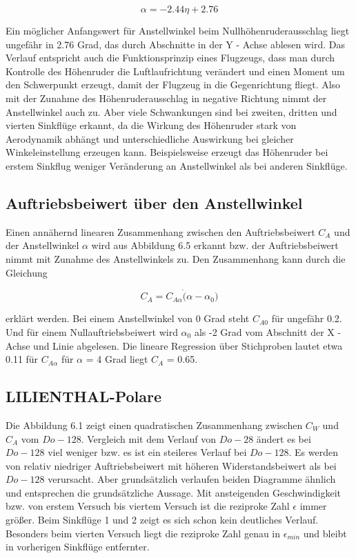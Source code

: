 \begin{equation*}
\alpha = -2.44 \eta + 2.76
\end{equation*}

Ein möglicher Anfangswert für Anstellwinkel beim Nullhöhenruderausschlag liegt ungefähr in 2.76 Grad, das durch Abschnitte in der Y - Achse ablesen wird. Das Verlauf entspricht auch die Funktionsprinzip eines Flugzeugs, dass man durch Kontrolle des Höhenruder die Luftlaufrichtung verändert und einen Moment um den Schwerpunkt erzeugt, damit der Flugzeug in die Gegenrichtung fliegt. Also mit der Zunahme des Höhenruderausschlag in negative Richtung nimmt der Anstellwinkel auch zu. Aber viele Schwankungen sind bei zweiten, dritten und vierten Sinkflüge erkannt, da die Wirkung des Höhenruder stark von Aerodynamik abhängt und unterschiedliche Auswirkung bei gleicher Winkeleinstellung erzeugen kann. Beispielsweise erzeugt das Höhenruder bei erstem Sinkflug weniger Veränderung an Anstellwinkel als bei anderen Sinkflüge. 

\subsection{Auftriebsbeiwert über den Anstellwinkel}
Einen annähernd linearen Zusammenhang zwischen den Auftriebsbeiwert $C_{A}$ und der Anstellwinkel $\alpha$ wird aus Abbildung 6.5 erkannt bzw. der Auftriebsbeiwert nimmt mit Zunahme des Anstellwinkels zu. Den Zusammenhang kann durch die Gleichung 

\begin{equation*}
C_{A} = C_{A\alpha} \dot (\alpha-\alpha_{0})
\end{equation*}

erklärt werden. Bei einem Anstellwinkel von 0 Grad steht $C_{A0}$ für ungefähr 0.2. Und für einem Nullauftriebsbeiwert wird $\alpha_{0}$ als -2 Grad vom Abschnitt der X - Achse und Linie abgelesen. Die lineare Regression über Stichproben lautet etwa 0.11 für $C_{A\alpha}$ für $\alpha$ = 4 Grad liegt $C_{A}$ = 0.65.

\subsection{LILIENTHAL-Polare}
Die Abbildung 6.1 zeigt einen quadratischen Zusammenhang zwischen $C_{W}$ und $C_{A}$ vom $Do -128$. Vergleich mit dem Verlauf von $Do - 28$ ändert es bei $Do - 128$ viel weniger bzw. es ist ein steileres Verlauf bei $Do - 128$. Es werden von relativ niedriger Auftriebsbeiwert mit höheren Widerstandsbeiwert als bei $Do -128$ verursacht. Aber grundsätzlich verlaufen beiden Diagramme ähnlich und entsprechen die grundsätzliche Aussage. Mit ansteigenden Geschwindigkeit bzw. von erstem Versuch bis viertem Versuch ist die reziproke Zahl $\epsilon$ immer größer. Beim Sinkflüge 1 und 2 zeigt es sich schon kein deutliches Verlauf.  Besonders beim vierten Versuch liegt die reziproke Zahl genau in $\epsilon_{min}$ und bleibt in vorherigen Sinkflüge entfernter. 


